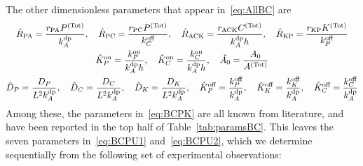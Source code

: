 \documentclass[11pt]{article}
\newcommand{\6}[1]{#1_{\text{6}}}
\newcommand{\3}[1]{#1_{\text{3}}}
\newcommand{\Tot}[1]{#1^\text{(Tot)}}
\newcommand{\A}[1]{#1_A}
\begin{document}
The other dimensionless parameters that appear in\ \eqref{eq:AllBC} are 
\begin{subequations}
\label{eq:BCparams}
\begin{gather}
\label{eq:BCPU1}
\hat{R}_\text{PA}=\frac{r_\text{PA} \Tot{P}}{\kdp_A},\quad \hat{R}_\text{PC}=\frac{r_\text{PC} \Tot{P}}{\koff_C},\quad \hat{R}_\text{ACK}=\frac{r_\text{ACK}\Tot{C}}{\kdp_A h},\quad \hat{R}_\text{KP}=\frac{r_\text{KP}\Tot{K}}{\koff_P}\\ 
\label{eq:BCPU2}
\KhatonP=\frac{{\kon_P}}{\A{\kdp} h },\quad \KhatonC=\frac{{\kon_C}}{\A{\kdp} h }, \quad \hat{A_0}=\frac{A_0}{\Tot{A}}\\
\label{eq:BCPK}
\DhatP =\frac{D_P}{L^2 \A{\kdp}}, \quad \DhatC =\frac{D_C}{L^2 \A{\kdp}}, \quad  \DhatK =\frac{D_K}{L^2 \A{\kdp}},\quad \KhatoffP = \frac{\koff_P}{\kdp_A},\quad \KhatoffK = \frac{\koff_K}{\kdp_A},\quad \KhatoffC = \frac{\koff_C}{\kdp_A}
\end{gather}
\end{subequations}
Among these, the parameters in\ \eqref{eq:BCPK} are all known from literature, and have been reported in the top half of Table\ \ref{tab:paramsBC}. This leaves the seven parameters in\ \eqref{eq:BCPU1} and\ \eqref{eq:BCPU2}, which we determine sequentially from the following set of experimental observations:
\end{document}
